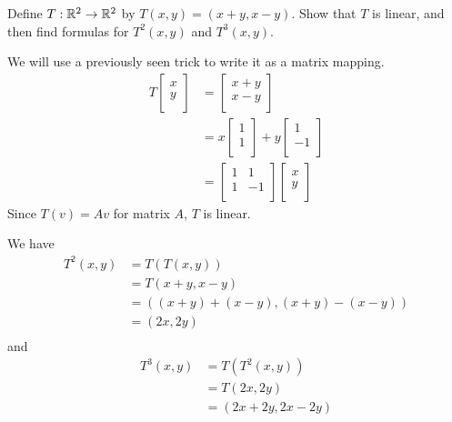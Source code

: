 \documentclass{article}
\begin{document}
\begin{example}
  Define $T: \mathbb{R}^2 \to \mathbb{R}^2$ by $T(x, y) = (x + y, x-y)$. Show that $T$ is linear, and then find formulas for $T^2(x, y)$ and $T^3(x, y)$.

  We will use a previously seen trick to write it as a matrix mapping.
  \begin{align*}
    T
    \begin{bmatrix}
      x\\y\\
    \end{bmatrix} &=
    \begin{bmatrix}
      x + y\\
      x - y\\
    \end{bmatrix}\\
    &= x
    \begin{bmatrix}
      1\\1\\
    \end{bmatrix} + y
    \begin{bmatrix}
      1\\-1\\
    \end{bmatrix}\\
    &=
    \begin{bmatrix}
      1 & 1\\
      1 & -1\\
    \end{bmatrix}
    \begin{bmatrix}
      x\\y\\
    \end{bmatrix}
  \end{align*}
  Since $T(v) = Av$ for matrix $A$, $T$ is linear.

  We have
  \begin{align*}
    T^2(x, y) &= T(T(x, y))\\
    &= T(x+y, x-y)\\
    &= ((x+y) + (x-y), (x+ y) - (x-y))\\
    &= (2x, 2y)\\
  \end{align*} and
  \begin{align*}
    T^3(x, y) &= T(T^2(x, y))\\
    &= T(2x, 2y)\\
    &= (2x + 2y, 2x - 2y)\\
  \end{align*}


\end{example}
\end{document}
